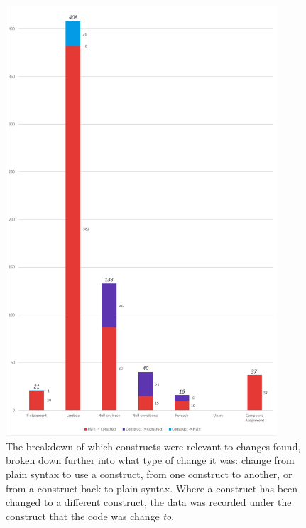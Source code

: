 \documentclass{article}
\begin{document}
        \begin{figure}[htbp]
            \centering
            \includegraphics[width=0.9\textwidth]{commitBreakdown}
            \caption{The breakdown of which constructs were relevant to changes found, broken down further into what type of change it was: change from plain syntax to use a construct, from one construct to another, or from a construct back to plain syntax. Where a construct has been changed to a different construct, the data was recorded under the construct that the code was change \emph{to}.}
            \label{fig:commitBreakdown}
        \end{figure}
\end{document}
